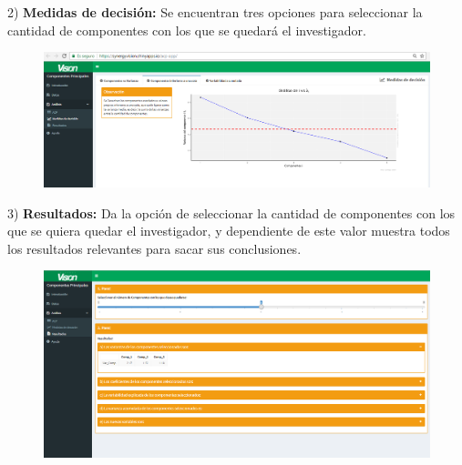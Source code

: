 \documentclass[12pt,letterpaper]{report} %
\begin{document}
\begin{itemize}
\newpage

2) \textbf{Medidas de decisión:} Se encuentran tres opciones para seleccionar la cantidad de componentes con los que se quedará el investigador. 

\begin{figure}[H]
\begin{center}
\includegraphics[width=15 cm,height=10 cm]{img/Analisis-decision.png}
\end{center}
\end{figure}

\newpage

3) \textbf{Resultados:} Da la opción de seleccionar la cantidad de componentes con los que se quiera quedar el investigador, y dependiente de este valor muestra todos los resultados relevantes para sacar sus conclusiones.

\begin{figure}[H]
\begin{center}
\includegraphics[width=15 cm,height=10 cm]{img/Analisis-Resultados.png}
\end{center}
\end{figure}


\end{itemize}
\end{document}
